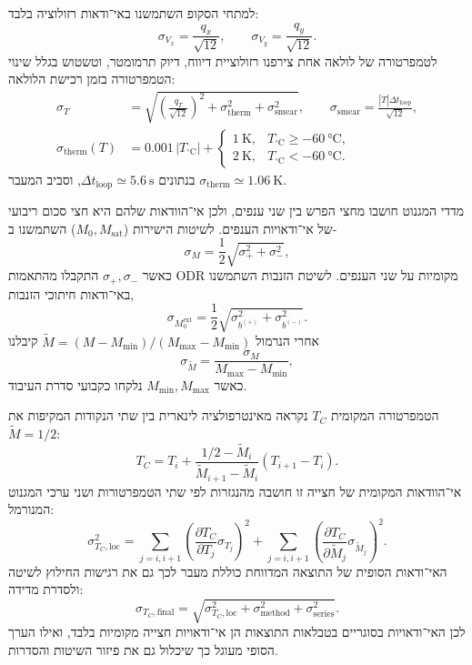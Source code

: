\documentclass{extarticle}
\begin{document}
למתחי הסקופ השתמשנו באי־ודאות רזולוציה בלבד:
\begin{equation}
\sigma_{V_x}=\frac{q_x}{\sqrt{12}},
\qquad
\sigma_{V_y}=\frac{q_y}{\sqrt{12}}.
\end{equation}
לטמפרטורה של לולאה אחת צירפנו רזולוציית דיווח, דיוק תרמומטר, וטשטוש בגלל שינוי הטמפרטורה בזמן רכישת הלולאה:
\begin{align}
\sigma_T&=\sqrt{\left(\frac{q_T}{\sqrt{12}}\right)^2+
\sigma_{\mathrm{therm}}^2+\sigma_{\mathrm{smear}}^2},\qquad
\sigma_{\mathrm{smear}}=\frac{|\dot T|\Delta t_{\mathrm{loop}}}{\sqrt{12}},\\
\sigma_{\mathrm{therm}}(T)&=0.001\,|T_{^\circ\mathrm{C}}|+
\begin{cases}
\SI{1}{\kelvin}, & T_{^\circ\mathrm{C}}\ge\SI{-60}{\degreeCelsius},\\
\SI{2}{\kelvin}, & T_{^\circ\mathrm{C}}<\SI{-60}{\degreeCelsius}.
\end{cases}
\end{align}
בנתונים
$\Delta t_{\mathrm{loop}}\simeq\SI{5.6}{\second}$,
וסביב המעבר
$\sigma_{\mathrm{therm}}\simeq\SI{1.06}{\kelvin}$.

מדדי המגנוט חושבו מחצי הפרש בין שני ענפים, ולכן אי־הוודאות שלהם היא חצי סכום ריבועי של אי־ודאויות הענפים. לשיטות הישירות
($M_0,M_{\mathrm{sat}}$)
השתמשנו ב-
\begin{equation}
\sigma_M=\frac{1}{2}\sqrt{\sigma_{+}^2+\sigma_{-}^2},
\end{equation}
כאשר
$\sigma_{+},\sigma_{-}$
התקבלו מהתאמות
\textenglish{ODR}
מקומיות על שני הענפים. לשיטת הזנבות השתמשנו באי־ודאות חיתוכי הזנבות,
\begin{equation}
\sigma_{M_0^{\mathrm{ext}}}=\frac{1}{2}\sqrt{\sigma_{b^{(+)}}^2+\sigma_{b^{(-)}}^2}.
\end{equation}
אחרי הנרמול
$\tilde M=(M-M_{\min})/(M_{\max}-M_{\min})$
קיבלנו
\begin{equation}
\sigma_{\tilde M}=\frac{\sigma_M}{M_{\max}-M_{\min}},
\end{equation}
כאשר
$M_{\min},M_{\max}$
נלקחו כקבועי סדרת העיבוד.

הטמפרטורה המקומית
$T_C$
נקראה מאינטרפולציה לינארית בין שתי הנקודות המקיפות את
$\tilde M=1/2$:
\begin{equation}
T_C=T_i+\frac{1/2-\tilde M_i}{\tilde M_{i+1}-\tilde M_i}(T_{i+1}-T_i).
\end{equation}
אי־הוודאות המקומית של חצייה זו חושבה מהנגזרות לפי שתי הטמפרטורות ושני ערכי המגנוט המנורמל:
\begin{equation}
\sigma_{T_C,\mathrm{loc}}^2=
\sum_{j=i,i+1}\left(\frac{\partial T_C}{\partial T_j}\sigma_{T_j}\right)^2+
\sum_{j=i,i+1}\left(\frac{\partial T_C}{\partial \tilde M_j}\sigma_{\tilde M_j}\right)^2.
\label{eq:curie-sigmaTc-local}
\end{equation}
האי־ודאות הסופית של התוצאה המדווחת כוללת מעבר לכך גם את רגישות החילוץ לשיטה ולסדרת מדידה:
\begin{equation}
\sigma_{T_C,\mathrm{final}}=\sqrt{\sigma_{T_C,\mathrm{loc}}^2+
\sigma_{\mathrm{method}}^2+
\sigma_{\mathrm{series}}^2}.
\end{equation}
לכן האי־ודאויות בסוגריים בטבלאות התוצאות הן אי־ודאויות חצייה מקומיות בלבד, ואילו הערך הסופי מעוגל כך שיכלול גם את פיזור השיטות והסדרות.
\end{document}

